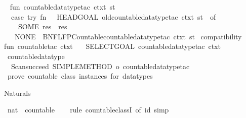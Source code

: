 \begin{isabellebody}
\isamarkupfalse%
\ {\isacartoucheopen}\isanewline
fun\ countable{\isacharunderscore}datatype{\isacharunderscore}tac\ ctxt\ st\ {\isacharequal}\isanewline
\ \ {\isacharparenleft}case\ try\ {\isacharparenleft}fn\ {\isacharparenleft}{\isacharparenright}\ {\isacharequal}{\isachargreater}\ HEADGOAL\ {\isacharparenleft}old{\isacharunderscore}countable{\isacharunderscore}datatype{\isacharunderscore}tac\ ctxt{\isacharparenright}\ st{\isacharparenright}\ {\isacharparenleft}{\isacharparenright}\ of\isanewline
\ \ \ \ SOME\ res\ {\isacharequal}{\isachargreater}\ res\isanewline
\ \ {\isacharbar}\ NONE\ {\isacharequal}{\isachargreater}\ BNF{\isacharunderscore}LFP{\isacharunderscore}Countable{\isachardot}countable{\isacharunderscore}datatype{\isacharunderscore}tac\ ctxt\ st{\isacharparenright}{\isacharsemicolon}\isanewline
\isanewline
{\isacharparenleft}{\isacharasterisk}\ compatibility\ {\isacharasterisk}{\isacharparenright}\isanewline
fun\ countable{\isacharunderscore}tac\ ctxt\ {\isacharequal}\isanewline
\ \ SELECT{\isacharunderscore}GOAL\ {\isacharparenleft}countable{\isacharunderscore}datatype{\isacharunderscore}tac\ ctxt{\isacharparenright}{\isacharsemicolon}\isanewline
{\isacartoucheclose}\isanewline
\isanewline
{}\isamarkupfalse%
\ countable{\isacharunderscore}datatype\ {\isacharequal}\ {\isacartoucheopen}\isanewline
\ \ Scan{\isachardot}succeed\ {\isacharparenleft}SIMPLE{\isacharunderscore}METHOD\ o\ countable{\isacharunderscore}datatype{\isacharunderscore}tac{\isacharparenright}\isanewline
{\isacartoucheclose}\ {\isachardoublequoteopen}prove\ countable\ class\ instances\ for\ datatypes{\isachardoublequoteclose}%
\endisatagML
{\isafoldML}%
%
\isadelimML
%
\endisadelimML
%
\isadelimdocument
%
\endisadelimdocument
%
\isatagdocument
%
\isamarkuptrue%
%
\endisatagdocument
{\isafolddocument}%
%
\isadelimdocument
%
\endisadelimdocument
%
\begin{isamarkuptext}%
Naturals%
\end{isamarkuptext}\isamarkuptrue%
\isamarkupfalse%
\ nat\ {\isacharcolon}{\isacharcolon}\ countable\isanewline
%
\isadelimproof
\ \ %
\endisadelimproof
%
\isatagproof
{}\isamarkupfalse%
\ {\isacharparenleft}rule\ countable{\isacharunderscore}classI\ {\isacharbrackleft}of\ {\isachardoublequoteopen}id{\isachardoublequoteclose}{\isacharbrackright}{\isacharparenright}\ simp%
\endisatagproof
{\isafoldproof}%
%
\isadelimproof
%
\endisadelimproof
%
\begin{isamarkuptext}%

\end{isamarkuptext}
\end{isabellebody}
